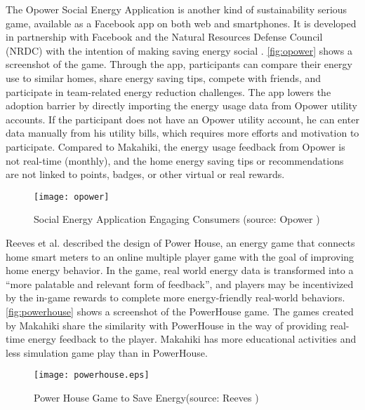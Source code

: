 The Opower Social Energy Application \cite{opower} is another kind of sustainability serious game, available as a Facebook app on both web and smartphones. It is developed in partnership with Facebook and the Natural Resources Defense Council (NRDC) with the intention of making saving energy social \cite{alliance}. \autoref{fig:opower} shows a screenshot of the game. Through the app, participants can compare their energy use to similar homes, share energy saving tips, compete with friends, and participate in team-related energy reduction challenges. The app lowers the adoption barrier by directly importing the energy usage data from Opower utility accounts. If the participant does not have an Opower utility account, he can enter data manually from his utility bills, which requires more efforts and motivation to participate. Compared to Makahiki, the energy usage feedback from Opower is not real-time (monthly), and the home energy saving tips or recommendations are not linked to points, badges, or other virtual or real rewards.

\begin{figure}[ht!]
	\centering
		\texttt{[image: opower]}
		\caption{Social Energy Application Engaging Consumers (source: Opower \cite{opower})}
		\label{fig:opower}
\end{figure}

Reeves et al. \cite{Reeves2011powerhouse} described the design of Power House, an energy game that connects home smart meters to an online multiple player game with the goal of improving home energy behavior. In the game, real world energy data is transformed into a ``more palatable and relevant form of
feedback'', and players may be incentivized by the in-game rewards to complete more energy-friendly real-world behaviors. \autoref{fig:powerhouse} shows a screenshot of the PowerHouse game. The games created by Makahiki share the similarity with PowerHouse in the way of providing real-time energy feedback to the player. Makahiki has more educational activities and less simulation game play than in PowerHouse.

\begin{figure}[ht!]
	\centering
		\texttt{[image: powerhouse.eps]}
		\caption{Power House Game to Save Energy(source: Reeves \cite{Reeves2011powerhouse})}
		\label{fig:powerhouse}
\end{figure}

